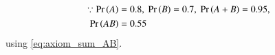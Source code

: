 \begin{align} 
\because	\pr{A} &= 0.8,\
\pr{B} = 0.7,\ 
\pr{A + B} = 0.95,
\\
\pr{AB} &= 
 0.55
\end{align}
using
\eqref{eq:axiom_sum_AB}.
